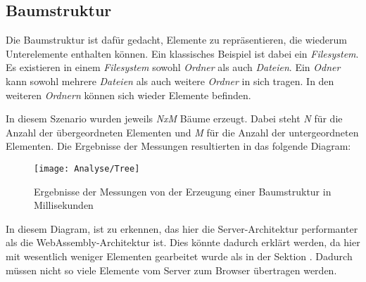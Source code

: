 \subsection{Baumstruktur}
\label{subsec:tree}
Die Baumstruktur ist dafür gedacht, Elemente zu repräsentieren, die wiederum Unterelemente
enthalten können. Ein klassisches Beispiel ist dabei ein \emph{Filesystem}. Es existieren in
einem \emph{Filesystem} sowohl \emph{Ordner} als auch \emph{Dateien}. Ein \emph{Odner} kann
sowohl mehrere \emph{Dateien} als auch weitere \emph{Ordner} in sich tragen. In den weiteren
\emph{Ordnern} können sich wieder Elemente befinden.

In diesem Szenario wurden jeweils \emph{NxM} Bäume erzeugt. Dabei steht \emph{N} für die Anzahl
der übergeordneten Elementen und \emph{M} für die Anzahl der untergeordneten Elementen. Die
Ergebnisse der Messungen resultierten in das folgende Diagram:

\begin{figure}[h]
    \centering
    \texttt{[image: Analyse/Tree]}
    \caption[Ergebnisse der Messungen von der Erzeugung einer Baumstruktur in
    Millisekunden]{Ergebnisse
    der Messungen von der Erzeugung einer Baumstruktur in Millisekunden}
    \label{img:table}
\end{figure}

In diesem Diagram, ist zu erkennen, das hier die Server-Architektur performanter als die
WebAssembly-Architektur ist. Dies könnte dadurch erklärt werden, da hier mit wesentlich weniger
Elementen gearbeitet wurde als in der Sektion \emph{}. Dadurch müssen nicht
so viele Elemente vom Server zum Browser übertragen werden.
